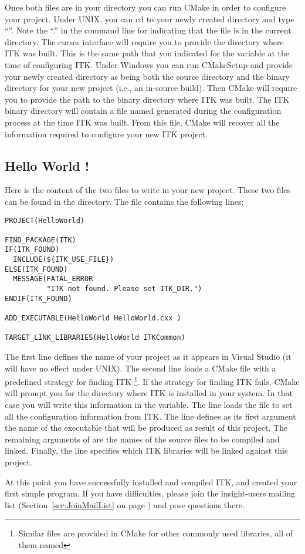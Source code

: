 Once both files are in your directory you can run CMake in order to configure
your project. Under UNIX, you can cd to your newly created directory
and type ``''. Note the ``.'' in the command line for indicating
that the  file is in the current directory. The
curses interface will require you to provide the directory where ITK
was built. This is the same path that you indicated for the
 variable at the time of configuring ITK. Under
Windows you can run CMakeSetup and provide your newly created
directory as being both the source directory and the binary directory for
your new project (i.e., an in-source build). Then CMake will require you to
provide the path to the binary directory where ITK was built. The ITK binary
directory will contain a file named  generated during the
configuration process at the time ITK was built.  From this file, CMake will
recover all the information required to configure your new ITK project.

\subsection{Hello World !}
\label{sec:HelloWorldITK}


Here is the content of the two files to write in your new project. These two
files can be found in the  directory. The
 file contains the following lines:

\small
\begin{verbatim}
PROJECT(HelloWorld)

FIND_PACKAGE(ITK)
IF(ITK_FOUND)
  INCLUDE(${ITK_USE_FILE})
ELSE(ITK_FOUND)
  MESSAGE(FATAL_ERROR
          "ITK not found. Please set ITK_DIR.")
ENDIF(ITK_FOUND)

ADD_EXECUTABLE(HelloWorld HelloWorld.cxx )

TARGET_LINK_LIBRARIES(HelloWorld ITKCommon)
\end{verbatim}
\normalsize

The first line defines the name of your project as it appears in Visual
Studio (it will have no effect under UNIX). The second line loads a CMake
file with a predefined strategy for finding ITK \footnote{Similar files are
provided in CMake for other commonly used libraries, all of them named
}. If the strategy for finding ITK fails, CMake will prompt
you for the directory where ITK is installed in your system. In that case you
will write this information in the  variable. The line  loads the  file to set
all the configuration information from ITK. The line 
defines as its first argument the name of the executable that will be produced
as result of this project. The remaining arguments of 
are the names of the source files to be compiled and linked.  Finally, the
 line specifies which ITK libraries will be
linked against this project.




At this point you have successfully installed and compiled ITK, and created
your first simple program. If you have difficulties, please join the
insight-users mailing list (Section~\ref{sec:JoinMailList} on page
\pageref{sec:JoinMailList}) and pose questions there.
